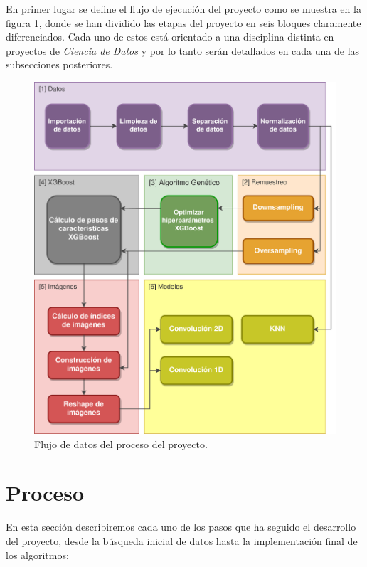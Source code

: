     En primer lugar se define el flujo de ejecución del proyecto como se muestra en la figura \ref{DataflowImage}, donde se han dividido las etapas del proyecto en seis bloques claramente diferenciados. Cada uno de estos está orientado a una disciplina distinta en proyectos de \textit{Ciencia de Datos} y por lo tanto serán detallados en cada una de las subsecciones posteriores.


    \begin{figure}[H]
        \centering
        \includegraphics[width=15cm]{archivos/4.Metodologia/DataflowImageESP}
        \caption{Flujo de datos del proceso del proyecto.}
        \label{DataflowImage}
    \end{figure}


\section{Proceso}

    En esta sección describiremos cada uno de los pasos que ha seguido el desarrollo del proyecto, desde la búsqueda inicial de datos hasta la implementación final de los algoritmos:

